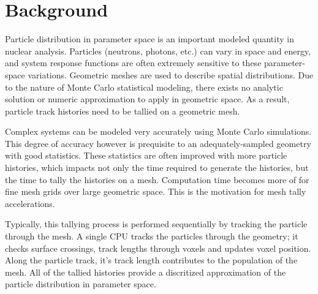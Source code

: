 
\section{Background}
Particle distribution in parameter space is an important modeled quantity in
nuclear analysis. Particles (neutrons, photons, etc.) can vary in space and
energy, and system response functions are often extremely sensitive to these
parameter-space variations. Geometric meshes are used to describe spatial
distributions. Due to the nature of Monte Carlo statistical modeling, there
exists no analytic solution or numeric approximation to apply in geometric
space. As a result, particle track histories need to be tallied on a geometric
mesh.

Complex systems can be modeled very accurately using Monte Carlo simulations.
This degree of accuracy however is prequisite to an adequately-sampled geometry
with good statistics. These statistics are often improved with more particle
histories, which impacts not only the time required to generate the histories,
but the time to tally the histories on a mesh. Computation time becomes more of
for fine mesh grids over large geometric space. This is the motivation for mesh
tally accelerations.

Typically, this tallying process is performed sequentially by tracking the
particle through the mesh. A single CPU tracks the particles through the
geometry; it checks surface crossings, track lengths through voxels and updates
voxel position. Along the particle track, it's track length contributes to the
population of the mesh. All of the tallied histories provide a discritized
approximation of the particle distribution in parameter space.
